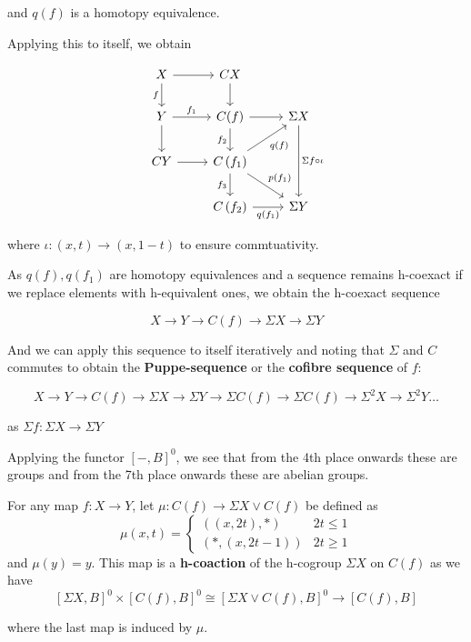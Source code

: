 and $q(f)$ is a homotopy equivalence.

Applying this to itself, we obtain

\[\begin{tikzcd}
	X & CX \\
	Y & {C(f)} & {\Sigma X} \\
	CY & {C\left(f_1\right)} \\
	& {C\left(f_2\right)} & {\Sigma Y}
	\arrow["f"', from=1-1, to=2-1]
	\arrow[from=1-1, to=1-2]
	\arrow[from=1-2, to=2-2]
	\arrow[from=2-1, to=3-1]
	\arrow[from=3-1, to=3-2]
	\arrow["{f_3}"', from=3-2, to=4-2]
	\arrow["{q\left(f_1\right)}"', from=4-2, to=4-3]
	\arrow[from=2-2, to=2-3]
	\arrow["{f_2}"', from=2-2, to=3-2]
	\arrow["{f_1}", from=2-1, to=2-2]
	\arrow["{q(f)}"', from=3-2, to=2-3]
	\arrow["{p\left(f_1\right)}", from=3-2, to=4-3]
	\arrow["{\Sigma f\circ\iota}", from=2-3, to=4-3]
\end{tikzcd}\]

where $\iota:(x,t)\to(x,1-t)$ to ensure commtuativity.

As $q(f),q\left(f_1\right)$ are homotopy equivalences and a sequence remains h-coexact if we replace elements with h-equivalent ones, we obtain the h-coexact sequence

\[X\to Y\to C(f)\to\Sigma X\to\Sigma Y\]

And we can apply this sequence to itself iteratively and noting that $\Sigma$ and $C$ commutes to obtain the \textbf{Puppe-sequence} or the \textbf{cofibre sequence} of $f$:

\[X\to Y\to C(f)\to\Sigma X\to\Sigma Y\to\Sigma C(f)\to\Sigma C(f)\to\Sigma^2X\to\Sigma^2Y\dots\]

as $\Sigma f:\Sigma X\to\Sigma Y$

Applying the functor $\left[-,B\right]^0$, we see that from the 4th place onwards these are groups and from the 7th place onwards these are abelian groups.

For any map $f:X\to Y$, let $\mu:C(f)\to\Sigma X\vee C(f)$ be defined as 
\[\mu(x,t)=\begin{cases}\left((x,2t),*\right)&2t\leq 1\\\left(*,(x,2t-1)\right)&2t\geq 1\end{cases}\]
and $\mu(y)=y$. This map is a \textbf{h-coaction} of the h-cogroup $\Sigma X$ on $C(f)$ as we have
\[\left[\Sigma X,B\right]^0\times\left[C(f),B\right]^0\cong\left[\Sigma X\vee C(f),B\right]^0\to\left[C(f),B\right]\]

where the last map is induced by $\mu$. 

